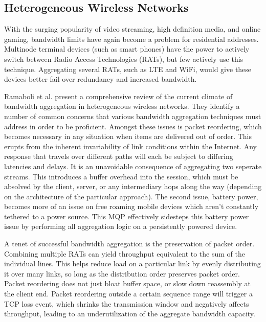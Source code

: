 \documentclass[12pt]{article}
\begin{document}
\subsection{Heterogeneous Wireless Networks}

	With the surging popularity of video streaming, high definition media, and online gaming, bandwidth limits have again become a problem for residential addresses. Multinode terminal devices (such as smart phones) have the power to actively switch between Radio Access Technologies (RATs), but few actively use this technique. Aggregating several RATs, such as LTE and WiFi, would give these devices better fail over redundancy and increased bandwidth.

	Ramaboli et al. present a comprehensive review of the current climate of bandwidth aggregation in heterogeneous wireless networks. They identify a number of common concerns that various bandwidth aggregation techniques must address in order to be proficient. Amongst these issues is packet reordering, which becomes necessary in any situation when items are delivered out of order. This erupts from the inherent invariability of link conditions within the Internet. Any response that travels over different paths will each be subject to differing latencies and delays. It is an unavoidable consequence of aggregating two seperate streams. This introduces a buffer overhead into the session, which must be absolved by the client, server, or any intermediary hops along the way (depending on the architecture of the particular approach)\cite{Ramaboli20121674}. The second issue, battery power, becomes more of an issue on free roaming mobile devices which aren't constantly tethered to a power source. This MQP effectively sidesteps this battery power issue by performing all aggregation logic on a persistently powered device.

	A tenet of successful bandwidth aggregation is the preservation of packet order. Combining multiple RATs can yield throughput equivalent to the sum of the individual lines. This helps reduce load on a particular link by evenly distributing it over many links, so long as the distribution order preserves packet order. Packet reordering does not just bloat buffer space, or slow down reassembly at the client end. Packet reordering outside a certain sequence range will trigger a TCP loss event, which shrinks the transmission window and negatively affects throughput, leading to an underutilization of the aggregate bandwidth capacity\cite{Ramaboli20121674}.
\end{document}
